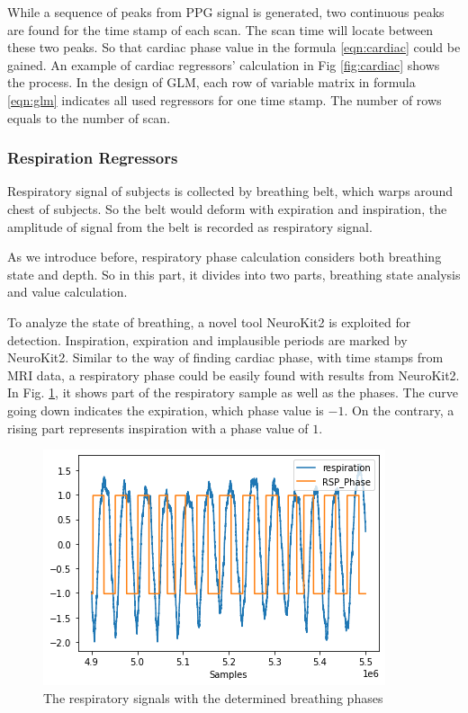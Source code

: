 While a sequence of peaks from PPG signal is generated, 
two continuous peaks are found for the time stamp of each scan.
The scan time will locate between these two peaks. 
So that cardiac phase value in the formula \ref{eqn:cardiac} could be gained. An example of 
cardiac regressors' calculation in Fig \ref{fig:cardiac} shows the process. 
In the design of GLM, each row of variable matrix in formula \ref{eqn:glm} indicates all used regressors
for one time stamp. The number of rows equals to the number of scan.

\subsubsection{Respiration Regressors}

Respiratory signal of subjects is collected by breathing belt, which warps around chest of subjects. 
So the belt would deform with expiration and inspiration, the amplitude of signal from the 
belt is recorded as respiratory signal. 

As we introduce before, respiratory phase calculation considers both breathing state and depth.
So in this part, it divides into two parts, breathing state analysis and value calculation.

To analyze the state of breathing, a novel tool NeuroKit2\cite{Makowski2021neurokit} is exploited 
for detection. Inspiration, expiration and implausible periods are marked by NeuroKit2. 
Similar to the way of finding cardiac phase, with time stamps from MRI data, a respiratory phase
could be easily found with results from NeuroKit2. In Fig. \ref{fig:rsp_phase}, it shows part of the 
respiratory sample as well as the phases. The curve going down indicates the expiration, which 
phase value is $-1$. On the contrary, a rising part represents inspiration with a phase value of $1$. 

\begin{figure}[htp]
    \centering
    \includegraphics[width=\columnwidth]{Figures/rsp_phase.png}
    \caption{The respiratory signals with the determined breathing phases}
    \label{fig:rsp_phase}
\end{figure} 

